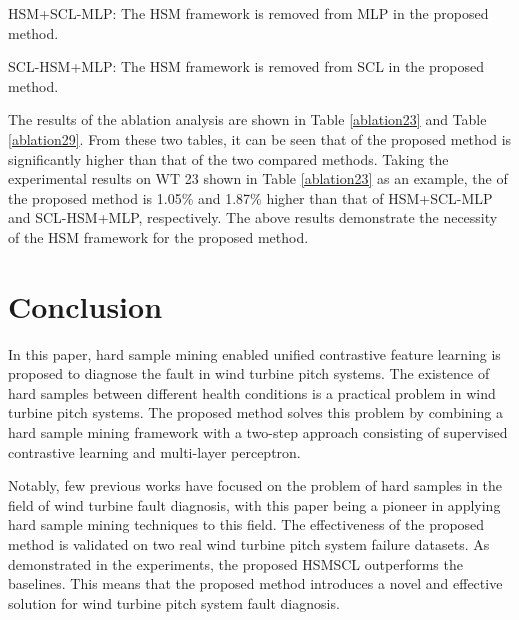 \documentclass[lettersize,journal]{IEEEtran}
\begin{document}
HSM+SCL-MLP: The HSM framework is removed from MLP in the proposed method.

SCL-HSM+MLP: The HSM framework is removed from SCL in the proposed method.

The results of the ablation analysis are shown in Table \ref{ablation23} and Table \ref{ablation29}. From these two tables, it can be seen that  of the proposed method is significantly higher than that of the two compared methods. Taking the experimental results on WT 23 shown in Table \ref{ablation23} as an example, the  of the proposed method is 1.05\% and 1.87\% higher than that of HSM+SCL-MLP and SCL-HSM+MLP, respectively. The above results demonstrate the necessity of the HSM framework for the proposed method. 



\section{Conclusion}

In this paper, hard sample mining enabled unified contrastive feature learning is proposed to diagnose the fault in wind turbine pitch systems. The existence of hard samples between different health conditions is a practical problem in wind turbine pitch systems. The proposed method solves this problem by combining a hard sample mining framework with a two-step approach consisting of supervised contrastive learning and multi-layer perceptron. 

Notably, few previous works have focused on the problem of hard samples in the field of wind turbine fault diagnosis, with this paper being a pioneer in applying hard sample mining techniques to this field. The effectiveness of the proposed method is validated on two real wind turbine pitch system failure datasets. As demonstrated in the experiments, the proposed HSMSCL outperforms the baselines. This means that the proposed method introduces a novel and effective solution for wind turbine pitch system fault diagnosis.

% 


\newpage
\end{document}
